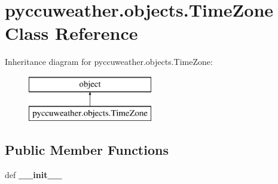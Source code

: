 \hypertarget{classpyccuweather_1_1objects_1_1_time_zone}{}\section{pyccuweather.\+objects.\+Time\+Zone Class Reference}
\label{classpyccuweather_1_1objects_1_1_time_zone}
Inheritance diagram for pyccuweather.\+objects.\+Time\+Zone\+:\begin{figure}[H]
\begin{center}
\leavevmode
\includegraphics[height=2.000000cm]{classpyccuweather_1_1objects_1_1_time_zone}
\end{center}
\end{figure}
\subsection*{Public Member Functions}
\begin{DoxyCompactItemize}
\item 
\hypertarget{classpyccuweather_1_1objects_1_1_time_zone_a890f93b8a59b082d6f6fc7f549c3cf36}{}def {\bfseries \+\_\+\+\_\+init\+\_\+\+\_\+}\label{classpyccuweather_1_1objects_1_1_time_zone_a890f93b8a59b082d6f6fc7f549c3cf36}

\end{DoxyCompactItemize}

